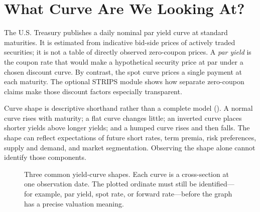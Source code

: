 \documentclass[11pt]{article}
\begin{document}
\section{What Curve Are We Looking At?}

The U.S. Treasury publishes a daily nominal par yield curve at standard maturities. It is estimated from indicative bid-side prices of actively traded securities; it is not a table of directly observed zero-coupon prices. A \emph{par yield} is the coupon rate that would make a hypothetical security price at par under a chosen discount curve. By contrast, the spot curve prices a single payment at each maturity. The optional STRIPS module shows how separate zero-coupon claims make those discount factors especially transparent.

Curve shape is descriptive shorthand rather than a complete model (). A normal curve rises with maturity; a flat curve changes little; an inverted curve places shorter yields above longer yields; and a humped curve rises and then falls. The shape can reflect expectations of future short rates, term premia, risk preferences, supply and demand, and market segmentation. Observing the shape alone cannot identify those components.

\begin{figure}[ht]
  \centering
  \caption{Three common yield-curve shapes. Each curve is a cross-section at one observation date. The plotted ordinate must still be identified---for example, par yield, spot rate, or forward rate---before the graph has a precise valuation meaning.}
  \label{fig:curve-shapes}
\end{figure}
\end{document}
